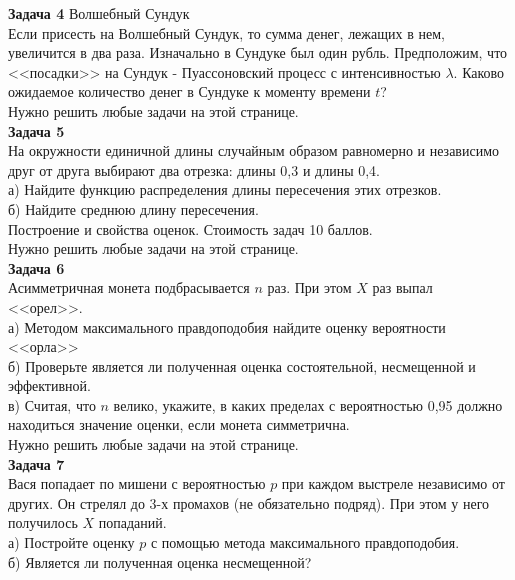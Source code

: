 \documentclass[pdftex,12pt,a4paper]{article}
\begin{document}
\textbf{Задача 4} Волшебный Сундук \\
Если присесть на Волшебный Сундук, то сумма денег, лежащих в нем, увеличится в два раза. Изначально в Сундуке был один рубль. Предположим, что <<посадки>> на Сундук - Пуассоновский процесс с интенсивностью $\lambda$. Каково ожидаемое количество денег в Сундуке к моменту времени $t$? \\

Нужно решить любые \textbf{} задачи на этой странице. \\

\textbf{Задача 5} \\
На окружности единичной длины случайным образом равномерно и независимо друг от друга выбирают два отрезка: длины 0,3 и длины 0,4. \\
а) Найдите функцию распределения длины пересечения этих отрезков. \\
б) Найдите среднюю длину пересечения. \\




\newpage
Построение и свойства оценок. Стоимость задач 10 баллов. \\
Нужно решить любые \textbf{} задачи на этой странице. \\

\textbf{Задача 6} \\
Асимметричная монета подбрасывается $n$ раз. При этом $X$ раз выпал <<орел>>. \\
а) Методом максимального правдоподобия найдите оценку вероятности <<орла>> \\
б) Проверьте является ли полученная оценка состоятельной, несмещенной и эффективной.\\
в) Считая, что $n$ велико, укажите, в каких пределах с вероятностью 0,95 должно находиться значение оценки, если монета симметрична. \\


Нужно решить любые \textbf{} задачи на этой странице. \\


\textbf{Задача 7} \\
Вася попадает по мишени с вероятностью $p$ при каждом выстреле независимо от других. Он стрелял до 3-х промахов (не обязательно подряд). При этом у него получилось $X$ попаданий. \\
а) Постройте оценку $p$ с помощью метода максимального правдоподобия. \\
б) Является ли полученная оценка несмещенной? \\
\end{document}
